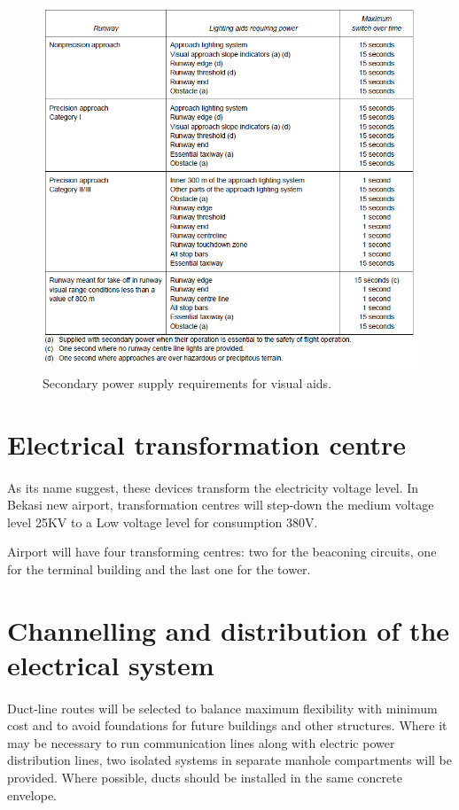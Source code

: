 	\begin{figure}[H]
		\centering
		\includegraphics[clip, trim=0cm 0cm 0cm 0cm, width=\textwidth]{./images/electric/requirements}
		\caption{Secondary power supply requirements for visual aids.}
		\label{requirements}
	\end{figure}
	
	\section{Electrical transformation centre}
	\paragraph{} As its name suggest, these devices transform the electricity voltage level. In Bekasi new airport, transformation centres will step-down the medium voltage level 25KV to a Low voltage level for consumption 380V.
	
	Airport will have four transforming centres: two for the beaconing circuits, one for the terminal building and the last one for the tower.
	
	
	\section{Channelling and distribution of the electrical system}
	\paragraph{} Duct-line routes will be selected to balance maximum flexibility with minimum cost and to avoid foundations for future buildings and other structures. Where it may be necessary to run communication lines along with electric power distribution lines, two isolated systems in separate manhole compartments will be provided. Where possible, ducts should be installed in the same concrete envelope.
	
